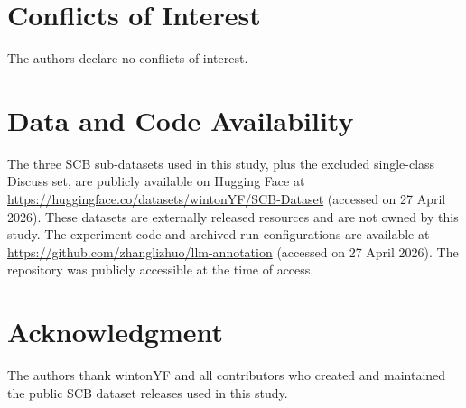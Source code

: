 \documentclass{ieeeaccess}
\begin{document}
\section*{Conflicts of Interest}
The authors declare no conflicts of interest.

\section*{Data and Code Availability}
The three SCB sub-datasets used in this study, plus the excluded
single-class Discuss set, are publicly available on Hugging Face at
\url{https://huggingface.co/datasets/wintonYF/SCB-Dataset} (accessed on
27 April 2026). These datasets are externally released resources and are
not owned by this study. The experiment code and archived run
configurations are available at
\url{https://github.com/zhanglizhuo/llm-annotation} (accessed on 27 April 2026).
The repository was publicly accessible at the time of access.

\section*{Acknowledgment}
The authors thank wintonYF and all contributors who created and maintained
the public SCB dataset releases used in this study.
\end{document}
